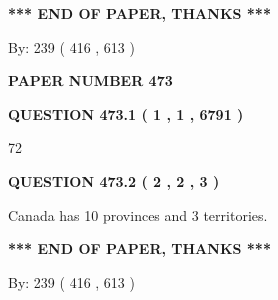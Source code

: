 \documentclass[12pt]{article}
\begin{document}
\vspace{1.0in} 
{\textbf{\large{ *** END OF PAPER, THANKS *** }}} 
   
   
\hspace{1.0in} By: 
 239 ( 416 ,  613 )
   
   
   
   
\newpage 
\setcounter{page}{ 
   473001 } 
   
   
   
   
 {\textbf{ \Large{ PAPER NUMBER  473  }}}
   
   
\vspace{0.2in}
   
   
   
   
   
   
 \vspace{0.2in}
 
 
 
 
   
   
  
\vspace{0.2in}
  
{\textbf{\Large{QUESTION
473.1 
 ( 1 , 1 , 6791 )
}}}
  
  
 
 
\noindent{}

72
 
 
  
\vspace{0.2in}
  
{\textbf{\Large{QUESTION
473.2 
 ( 2 , 2 , 3 )
}}}
  
  
 
 
\noindent{}
 
 
Canada has 10  provinces and 3 territories.
 
 
 
 
   
   
 \vspace{0.2in}
 
   
   
   
   
\vspace{1.0in} 
{\textbf{\large{ *** END OF PAPER, THANKS *** }}} 
   
   
\hspace{1.0in} By: 
 239 ( 416 ,  613 )
   
\end{document}

